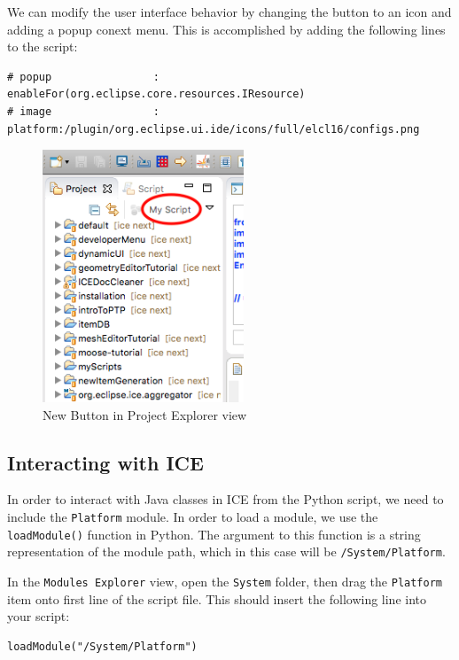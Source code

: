 We can modify the user interface behavior by changing the button to an icon and
adding a popup conext menu. This is accomplished by adding the following lines
to the script:

{\small
\begin{verbatim}
# popup				   : enableFor(org.eclipse.core.resources.IResource) 
# image				   : platform:/plugin/org.eclipse.ui.ide/icons/full/elcl16/configs.png
\end{verbatim}
}

\begin{figure}[!ht]
\centering
\includegraphics[width=6cm]{images/projexplorer}
\caption{New Button in Project Explorer view}
\label{fig:myscript}
\end{figure}

\subsection{Interacting with ICE}

In order to interact with Java classes in ICE from the Python script, we 
need to include the \texttt{Platform} module. In order to load a module, we use
the \texttt{loadModule()} function in Python. The argument to this function is a
string representation of the module path, which in this case will be
\texttt{/System/Platform}. 

In the \texttt{Modules Explorer} view, open the \texttt{System} folder, then drag
the \texttt{Platform} item onto first line of the script file. This should insert
the following line into your script:

\lstset{basicstyle=\ttfamily\small, breaklines}

{\small
\begin{verbatim}
loadModule("/System/Platform")
\end{verbatim}
}

